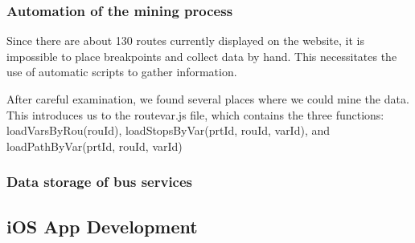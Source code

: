 \subsubsection{Automation of the mining process}

Since there are about 130 routes currently displayed on the website, it is impossible to place breakpoints and collect data by hand. This necessitates the use of automatic scripts to gather information.

After careful examination, we found several places where we could mine the data. This introduces us to the routevar.js file, which contains the three functions: loadVarsByRou(rouId), loadStopsByVar(prtId, rouId, varId), and loadPathByVar(prtId, rouId, varId)

\subsubsection{Data storage of bus services}

\subsection{iOS App Development}